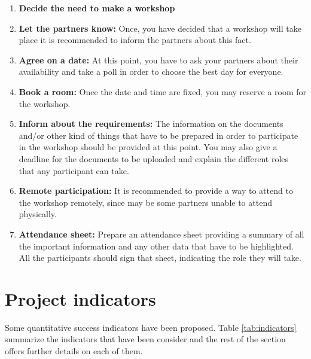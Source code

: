 \documentclass[draftclsnofoot,12pt,journal,onecolumn]{IEEEtran}
\begin{document}
\begin{enumerate}
	\item \textbf{Decide the need to make a workshop}
	\item \textbf{Let the partners know:} Once, you have decided that a workshop will take place it is recommended to inform the partners 					about this fact.
	\item \textbf{Agree on a date:} At this point, you have to ask your partners about their availability and take a poll in order to 							choose the best day for everyone.
	\item \textbf{Book a room:} Once the date and time are fixed, you may reserve a room for the workshop.
	\item \textbf{Inform about the requirements:} The information on the documents and/or other kind of things that have to be prepared in 					order to participate in the workshop should be provided at this point. You may also give a deadline for the documents to be 							uploaded and explain the different roles that any participant can take.  
	\item \textbf{Remote participation:} It is recommended to provide a way to attend to the workshop remotely, since may be some partners 					unable to attend physically.  
	\item \textbf{Attendance sheet:} Prepare an attendance sheet providing a summary of all the important information and any other data 						that have to be highlighted. All the participants should sign that sheet, indicating the role they will take. 
\end{enumerate}
 

\section{Project indicators}
\label{sec:indicators}

Some quantitative success indicators have been proposed.
Table \ref{tab:indicators} summarize the indicators that have been consider and the rest of the section offers further details on each of them.
\end{document}
